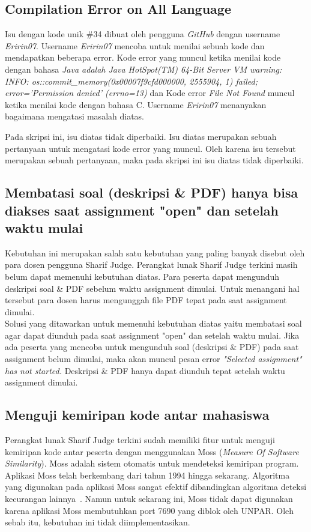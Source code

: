 \subsection{Compilation Error on All Language}
Isu dengan kode unik \#34 dibuat oleh pengguna \textit{GitHub} dengan username \textit{Eririn07}. Username \textit{Eririn07} mencoba untuk menilai sebuah kode dan mendapatkan beberapa error. Kode error yang muncul ketika menilai kode dengan bahasa \textit{Java adalah Java HotSpot(TM) 64-Bit Server VM warning: INFO: os::commit\_memory(0x00007f9cfd000000, 2555904, 1) failed; error='Permission denied' (errno=13)} dan Kode error \textit{File Not Found} muncul ketika menilai kode dengan bahasa C. Username \textit{Eririn07} menanyakan bagaimana mengatasi masalah diatas.

Pada skripsi ini, isu diatas tidak diperbaiki. Isu diatas merupakan sebuah pertanyaan untuk mengatasi kode error yang muncul. Oleh karena isu tersebut merupakan sebuah pertanyaan, maka pada skripsi ini isu diatas tidak diperbaiki.

\subsection{Membatasi soal (deskripsi \& PDF) hanya bisa diakses saat assignment "open" dan setelah waktu mulai}
\label{subsec:membatasisoal}
Kebutuhan ini merupakan salah satu kebutuhan yang paling banyak disebut oleh para dosen pengguna Sharif Judge. Perangkat lunak Sharif Judge terkini masih belum dapat memenuhi kebutuhan diatas. Para peserta dapat mengunduh deskripsi soal \& PDF sebelum waktu assignment dimulai. Untuk menangani hal tersebut para dosen harus mengunggah file PDF tepat pada saat assignment dimulai. \\
Solusi yang ditawarkan untuk memenuhi kebutuhan diatas yaitu membatasi soal agar dapat diunduh pada saat assignment "open" dan setelah waktu mulai. Jika ada peserta yang mencoba untuk mengunduh soal (deskripsi \& PDF) pada saat assignment belum dimulai, maka akan muncul pesan error \textit{"Selected \textit{assignment"} has not started.} Deskripsi \& PDF hanya dapat diunduh tepat setelah waktu assignment dimulai.


\subsection{Menguji kemiripan kode antar mahasiswa}
Perangkat lunak Sharif Judge terkini sudah memiliki fitur untuk menguji kemiripan kode antar peserta dengan menggunakan Moss (\textit{Measure Of Software Similarity}). Moss adalah sistem otomatis untuk mendeteksi kemiripan program. Aplikasi Moss telah berkembang dari tahun 1994 hingga sekarang. Algoritma yang digunakan pada aplikasi Moss sangat efektif dibandingkan algoritma deteksi kecurangan lainnya~\cite{aiken:10:moss}. Namun untuk sekarang ini, Moss tidak dapat digunakan karena aplikasi Moss membutuhkan port 7690 yang diblok oleh UNPAR. Oleh sebab itu, kebutuhan ini tidak diimplementasikan.

